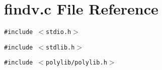 \section{findv.c File Reference}
\label{findv_8c}
{\tt \#include $<$stdio.h$>$}\par
{\tt \#include $<$stdlib.h$>$}\par
{\tt \#include $<$polylib/polylib.h$>$}\par
